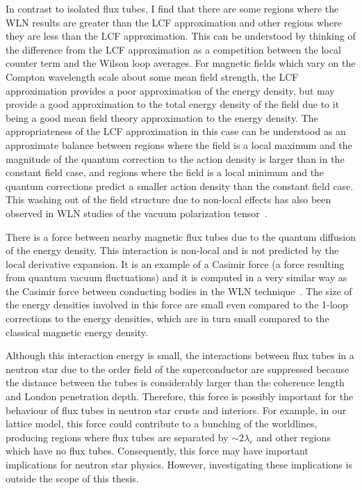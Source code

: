 In contrast to isolated flux tubes, I find that there are some regions where the 
\ac{WLN} results are greater than the \ac{LCF} approximation and other 
regions where they are less than the \ac{LCF} approximation. This can be understood 
by thinking of the difference from the \ac{LCF} approximation as a competition 
between the local counter term and the Wilson loop averages. 
For magnetic fields which vary on the Compton wavelength scale 
about some mean field strength, the \ac{LCF} approximation 
provides a poor approximation of the energy density, but may provide a 
good approximation to the total energy density of the field due to it 
being a good mean field theory approximation to the energy density. 
The appropriateness of the \ac{LCF} approximation in this case
can be understood as an approximate balance between regions where the 
field is a local maximum and the magnitude of the quantum correction to the 
action density is larger than in the constant field case, and regions where 
the field is a local minimum and the quantum corrections predict a smaller 
action density than the constant field case. This 
washing out of the field structure due to non-local effects has also 
been observed in \ac{WLN} studies of the vacuum polarization 
tensor~\cite{PhysRevD.84.065035}. 

There is a force between nearby magnetic flux tubes due 
to the quantum diffusion of the energy density. This interaction is 
non-local and is not predicted by the local derivative expansion.
It is an example of a Casimir force (\ie a force resulting from 
quantum vacuum fluctuations) and it is computed in a very similar 
way as the Casimir force between conducting bodies in the \ac{WLN} 
technique~\cite{Gies:2003cv}.
The size of the energy densities involved in this force are small even 
compared to the 1-loop corrections to the energy densities, which are
in turn small compared to the classical magnetic energy density. 

Although this interaction energy is small, 
the interactions between flux tubes in a neutron star due to the 
order field of the superconductor are suppressed because the distance between the 
tubes is considerably larger than the coherence length and 
London penetration depth. Therefore, this force is possibly important 
for the behaviour of flux tubes in neutron star crusts and interiors.
For example, in our lattice model, this force could contribute 
to a bunching of the worldlines, producing regions where flux tubes 
are separated by $\sim2\lambda_e$ and other regions which have 
no flux tubes. Consequently, this force may have important implications 
for neutron star physics. However, investigating these implications is 
outside the scope of this thesis.

